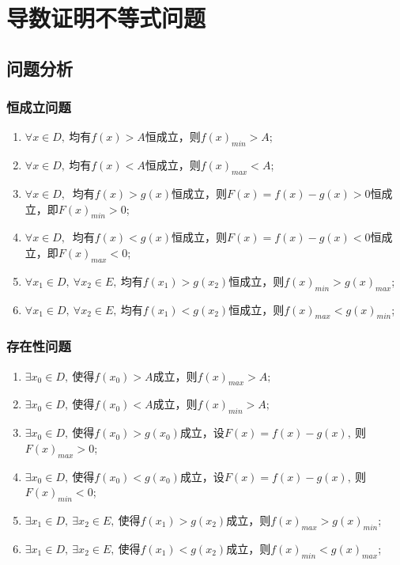 
\section{导数证明不等式问题}

\renewcommand{\theexample}{\arabic{example}}
\newenvironment{example}[1][]{ \refstepcounter{example} \textbf{例\theexample:#1} \hspace{0.5em}}{\hspace{\stretch{1}} }

\subsection{问题分析}
\subsubsection{恒成立问题}
\begin{enumerate}[1)]
\item $ \forall x\in D, ~$均有$ f(x)>A $恒成立，则$ f(x)_{min}>A $;
\item $ \forall x\in D, ~$均有$ f(x)<A $恒成立，则$ f(x)_{max}<A $;
\item  $ \forall x\in D, ~$ 均有$ f(x)>g(x) $恒成立，则$ F(x)=f(x)-g(x) >0$恒成立，即$ F(x)_{min}>0 $;
\item  $ \forall x\in D, ~$ 均有$ f(x)<g(x) $恒成立，则$ F(x)=f(x)-g(x) <0$恒成立，即$ F(x)_{max}<0 $;
\item $\forall x_1\in D,~$$\forall x_2\in E,~$均有$ f(x_1)>g(x_2) $恒成立，则$ f(x)_{min}>g(x)_{max} $;
\item $\forall x_1\in D,~$$\forall x_2\in E,~$均有$ f(x_1)<g(x_2) $恒成立，则$ f(x)_{max}<g(x)_{min} $;
\end{enumerate}
\subsubsection{存在性问题}
\begin{enumerate}[1)]
\item $ \exists x_0\in D ,~$使得$ f(x_0) >A$成立，则$ f(x)_{max}>A; $ 
\item $ \exists x_0\in D ,~$使得$ f(x_0) <A$成立，则$ f(x)_{min}>A; $ 
\item $\exists x_0 \in D,~$使得$ f(x_0)>g(x_0) $成立，设$ F(x)=f(x)-g(x) ,~$则$ F(x)_{max}>0 $;
\item $\exists x_0 \in D,~$使得$ f(x_0)<g(x_0) $成立，设$ F(x)=f(x)-g(x) ,~$则$ F(x)_{min}<0 $;
\item $\exists x_1\in D,~$$\exists x_2\in E,~$使得$ f(x_1)>g(x_2) $成立，则$ f(x)_{max}>g(x)_{min} $;
\item $\exists x_1\in D,~$$\exists x_2\in E,~$使得$ f(x_1)<g(x_2) $成立，则$ f(x)_{min}<g(x)_{max} $;
\end{enumerate}
